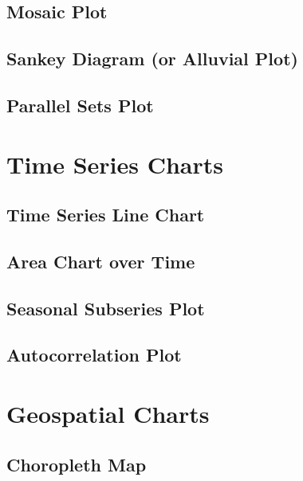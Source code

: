 \documentclass[
  letterpaper,
  DIV=11,
  numbers=noendperiod]{scrreprt}
\begin{document}
\subsection{Mosaic Plot}\label{mosaic-plot}

\subsection{Sankey Diagram (or Alluvial
Plot)}\label{sankey-diagram-or-alluvial-plot}

\subsection{Parallel Sets Plot}\label{parallel-sets-plot}

\section{Time Series Charts}\label{time-series-charts}

\subsection{Time Series Line Chart}\label{time-series-line-chart}

\subsection{Area Chart over Time}\label{area-chart-over-time}

\subsection{Seasonal Subseries Plot}\label{seasonal-subseries-plot}

\subsection{Autocorrelation Plot}\label{autocorrelation-plot}

\section{Geospatial Charts}\label{geospatial-charts}

\subsection{Choropleth Map}\label{choropleth-map}
\end{document}

